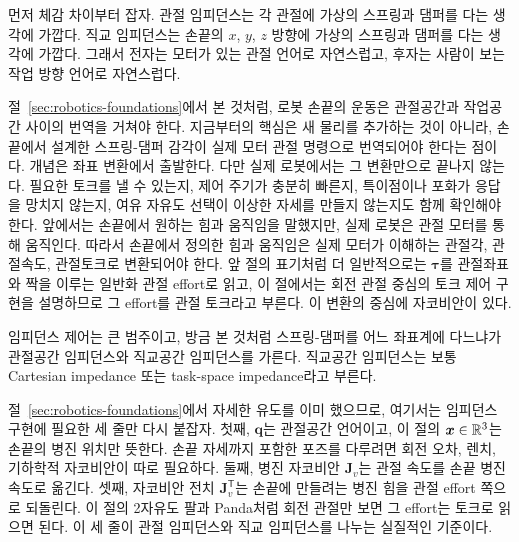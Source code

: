 먼저 체감 차이부터 잡자.
관절 임피던스는 각 관절에 가상의 스프링과 댐퍼를 다는 생각에 가깝다.
직교 임피던스는 손끝의 $x$, $y$, $z$ 방향에 가상의 스프링과 댐퍼를 다는 생각에 가깝다.
그래서 전자는 모터가 있는 관절 언어로 자연스럽고, 후자는 사람이 보는 작업 방향 언어로 자연스럽다.

절~\ref{sec:robotics-foundations}에서 본 것처럼, 로봇 손끝의 운동은 관절공간과 작업공간 사이의 번역을 거쳐야 한다.
지금부터의 핵심은 새 물리를 추가하는 것이 아니라, 손끝에서 설계한 스프링-댐퍼 감각이 실제 모터 관절 명령으로 번역되어야 한다는 점이다.
개념은 좌표 변환에서 출발한다.
다만 실제 로봇에서는 그 변환만으로 끝나지 않는다.
필요한 토크를 낼 수 있는지, 제어 주기가 충분히 빠른지, 특이점이나 포화가 응답을 망치지 않는지, 여유 자유도 선택이 이상한 자세를 만들지 않는지도 함께 확인해야 한다.
앞에서는 손끝에서 원하는 힘과 움직임을 말했지만, 실제 로봇은 관절 모터를 통해 움직인다.
따라서 손끝에서 정의한 힘과 움직임은 실제 모터가 이해하는 관절각, 관절속도, 관절토크로 변환되어야 한다.
앞 절의 표기처럼 더 일반적으로는 \(\bm{\tau}\)를 관절좌표와 짝을 이루는 일반화 관절 effort로 읽고, 이 절에서는 회전 관절 중심의 토크 제어 구현을 설명하므로 그 effort를 관절 토크라고 부른다.
%
%
%
이 변환의 중심에 자코비안이 있다.

임피던스 제어는 큰 범주이고, 방금 본 것처럼 스프링-댐퍼를 어느 좌표계에 다느냐가 관절공간 임피던스와 직교공간 임피던스를 가른다.
직교공간 임피던스는 보통 Cartesian impedance 또는 task-space impedance라고 부른다.

절~\ref{sec:robotics-foundations}에서 자세한 유도를 이미 했으므로, 여기서는 임피던스 구현에 필요한 세 줄만 다시 붙잡자.
첫째, $\bm{q}$는 관절공간 언어이고, 이 절의 $\bm{x}\in\mathbb{R}^3$는 손끝의 병진 위치만 뜻한다.
손끝 자세까지 포함한 포즈를 다루려면 회전 오차, 렌치, 기하학적 자코비안이 따로 필요하다.
둘째, 병진 자코비안 $\bm{J}_v$는 관절 속도를 손끝 병진 속도로 옮긴다.
셋째, 자코비안 전치 $\bm{J}_v^{\mathsf{T}}$는 손끝에 만들려는 병진 힘을 관절 effort 쪽으로 되돌린다.
%
이 절의 2자유도 팔과 Panda처럼 회전 관절만 보면 그 effort는 토크로 읽으면 된다.
%
이 세 줄이 관절 임피던스와 직교 임피던스를 나누는 실질적인 기준이다.

